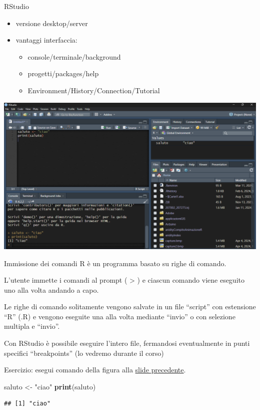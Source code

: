 \documentclass[
  ignorenonframetext,
]{beamer}
\newenvironment{Shaded}{\begin{snugshade}}{\end{snugshade}}
\newcommand{\FunctionTok}[1]{\textcolor[rgb]{0.13,0.29,0.53}{\textbf{#1}}}
\newcommand{\NormalTok}[1]{#1}
\newcommand{\OtherTok}[1]{\textcolor[rgb]{0.56,0.35,0.01}{#1}}
\newcommand{\StringTok}[1]{\textcolor[rgb]{0.31,0.60,0.02}{#1}}
\providecommand{\tightlist}{%
  \setlength{\itemsep}{0pt}\setlength{\parskip}{0pt}}
\begin{document}
\begin{frame}{RStudio}
\protect\hypertarget{rstudio}{}
\begin{itemize}
\tightlist
\item
  versione desktop/server
\item
  vantaggi interfaccia:

  \begin{itemize}
  \tightlist
  \item
    console/terminale/background
  \item
    progetti/packages/help
  \item
    Environment/History/Connection/Tutorial
  \end{itemize}
\end{itemize}

\includegraphics[width=10in,height=\textheight]{images/clipboard-3935879104.png}
\end{frame}

\begin{frame}[fragile]{Immissione dei comandi}
\protect\hypertarget{immissione-dei-comandi}{}
R è un programma basato su righe di comando.

L'utente immette i comandi al prompt ( \textgreater{} ) e ciascun
comando viene eseguito uno alla volta andando a capo.

Le righe di comando solitamente vengono salvate in un file ``script''
con estensione ``R'' (.R) e vengono eseguite una alla volta mediante
``invio'' o con selezione multipla e ``invio''.

Con RStudio è possibile eseguire l'intero file, fermandosi eventualmente
in punti specifici ``breakpoints'' (lo vedremo durante il corso)

\begin{block}{Esercizio:}
\protect\hypertarget{esercizio}{}
esegui comando della figura alla \protect\hyperlink{}{slide precedente}.

\begin{Shaded}
\begin{Highlighting}[]
\NormalTok{saluto }\OtherTok{\textless{}{-}} \StringTok{"ciao"}
\FunctionTok{print}\NormalTok{(saluto)}
\end{Highlighting}
\end{Shaded}

\begin{verbatim}
## [1] "ciao"
\end{verbatim}
\end{block}
\end{frame}
\end{document}
